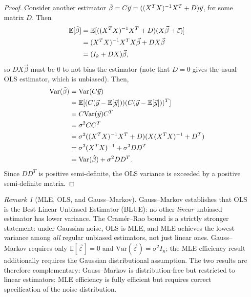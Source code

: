 \documentclass[11pt]{article}
\theoremstyle{definition}
\theoremstyle{plain}
\theoremstyle{remark}
\newtheorem{remark}{Remark}[section]
\begin{document}
\begin{proof}
Consider another estimator $\Tilde{\beta} = C\vec{y} = ((X^T X)^{-1}X^T+D)\vec{y}$, for some matrix $D$. Then
\begin{align}
    \mathbb{E}[\Tilde{\beta}] &= \mathbb{E}[((X^T X)^{-1}X^T+D)(X\vec{\beta} + \vec{\varepsilon})]\\
    &=(X^T X)^{-1}X^TX\vec{\beta} +DX\vec{\beta} \\
    & = (I_k + DX)\vec{\beta},
\end{align}
so $DX\vec{\beta}$ must be 0 to not bias the estimator (note that $D=0$ gives the usual OLS estimator, which is unbiased). Then,
\begin{align}
    \text{Var}(\Tilde{\beta}) &= \text{Var}(C\vec{y})\\
    & = \mathbb{E}[(C(\vec{y}-\mathbb{E}[\vec{y}]))(C(\vec{y}-\mathbb{E}[\vec{y}]))^T]\\
    &=C\text{Var}(\vec{y})C^T\\
    &= \sigma^2 CC^T\\
    &= \sigma^2 ((X^T X)^{-1}X^T+D)(X(X^T X)^{-1}+D^T)\\
    &= \sigma^2(X^TX)^{-1} + \sigma^2 DD^T\\
    & = \text{Var}(\hat{\beta}) + \sigma^2DD^T.
\end{align}
Since $DD^T$ is positive semi-definite, the OLS variance is exceeded by a positive semi-definite matrix.
\end{proof}

\begin{remark}[MLE, OLS, and Gauss--Markov]
    Gauss--Markov establishes that OLS is the Best Linear Unbiased Estimator (BLUE): no other \emph{linear} unbiased estimator has lower variance. The Cramér--Rao bound is a strictly stronger statement: under Gaussian noise, OLS is MLE, and MLE achieves the lowest variance among \emph{all} regular unbiased estimators, not just linear ones. Gauss--Markov requires only $\mathbb{E}[\vec{\varepsilon}] = 0$ and $\mathrm{Var}(\vec{\varepsilon}) = \sigma^2 I_n$; the MLE efficiency result additionally requires the Gaussian distributional assumption. The two results are therefore complementary: Gauss--Markov is distribution-free but restricted to linear estimators; MLE efficiency is fully efficient but requires correct specification of the noise distribution.
\end{remark}
\end{document}
